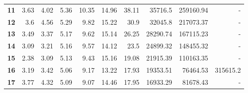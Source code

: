 \begin{table}[h]
\begin{center}
\begin{tabular}{crrrrrrrrr}
\textbf{11}                        & 3.63                           & 4.02                           & 5.36                           & 10.35                           & 14.96                           & 38.11                           & 35716.5                         & 259160.94                        & -                                \\
\textbf{12}                        & 3.6                            & 4.56                           & 5.29                           & 9.82                           & 15.22                           & 30.9                            & 32045.8                         & 217073.37                        & -                                \\
\textbf{13}                        & 3.49                           & 3.37                           & 5.17                           & 9.62                            & 15.14                           & 26.25                           & 28290.74                        & 167115.23                        & -                                \\
\textbf{14}                        & 3.09                           & 3.21                           & 5.16                           & 9.57                           & 14.12                           & 23.5                            & 24899.32                        & 148455.32                        & -                                \\
\textbf{15}                        & 2.38                           & 3.09                           & 5.13                           & 9.43                           & 15.16                           & 19.08                           & 21915.39                        & 110163.35                        & -                                \\
\textbf{16}                        & 3.19                           & 3.42                           & 5.06                           & 9.17                           & 13.22                           & 17.93                           & 19353.51                        & 76464.53                         & 315615.2                         \\
\textbf{17}                        & 3.77                           & 4.32                           & 5.09                           & 9.07                           & 14.46                           & 17.95                           & 16933.29                        & 81678.43                         & -                                \\

\end{tabular}
\end{center}
\end{table}
